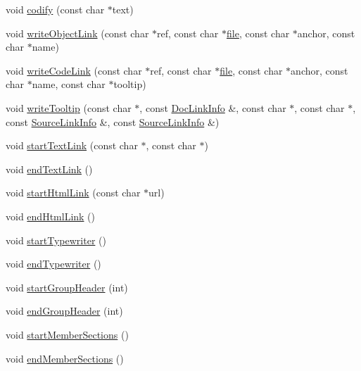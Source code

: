 \begin{DoxyCompactItemize}
void \hyperlink{class_man_generator_a6e70bf6444a4e6d5db43f5bbb7b6b125}{codify} (const char $\ast$text)
\item 
void \hyperlink{class_man_generator_a4bcf9c17c915914aca7b271c85aa08ea}{write\+Object\+Link} (const char $\ast$ref, const char $\ast$\hyperlink{class_output_generator_aed5ad11c3844cdf71ec6fee6c1c84286}{file}, const char $\ast$anchor, const char $\ast$name)
\item 
void \hyperlink{class_man_generator_ac4d91e5763d584238139d65d873e9f64}{write\+Code\+Link} (const char $\ast$ref, const char $\ast$\hyperlink{class_output_generator_aed5ad11c3844cdf71ec6fee6c1c84286}{file}, const char $\ast$anchor, const char $\ast$name, const char $\ast$tooltip)
\item 
void \hyperlink{class_man_generator_a8ec440b278091bf61579f35cd8237a25}{write\+Tooltip} (const char $\ast$, const \hyperlink{struct_doc_link_info}{Doc\+Link\+Info} \&, const char $\ast$, const char $\ast$, const \hyperlink{struct_source_link_info}{Source\+Link\+Info} \&, const \hyperlink{struct_source_link_info}{Source\+Link\+Info} \&)
\item 
void \hyperlink{class_man_generator_a3c1d7362119d49471f88a39189e63869}{start\+Text\+Link} (const char $\ast$, const char $\ast$)
\item 
void \hyperlink{class_man_generator_ae0b59e20362769f00731c90f0e3fdc00}{end\+Text\+Link} ()
\item 
void \hyperlink{class_man_generator_a605e678d3be65519e6b94dff6e403e79}{start\+Html\+Link} (const char $\ast$url)
\item 
void \hyperlink{class_man_generator_a7323695cedb872064ddb450875b2baea}{end\+Html\+Link} ()
\item 
void \hyperlink{class_man_generator_aa03f575a82549d2393bb080337769f1c}{start\+Typewriter} ()
\item 
void \hyperlink{class_man_generator_a918922201985cac387c671a9767021d1}{end\+Typewriter} ()
\item 
void \hyperlink{class_man_generator_a69dbc09e1398a0f64796d28a45642bba}{start\+Group\+Header} (int)
\item 
void \hyperlink{class_man_generator_a826a7e069686709295c162b2b2db7e25}{end\+Group\+Header} (int)
\item 
void \hyperlink{class_man_generator_a712f6f2ffa6fcc93d783510760a7a337}{start\+Member\+Sections} ()
\item 
void \hyperlink{class_man_generator_a860d52eda1510b0c06177ac90c18b850}{end\+Member\+Sections} ()
\item 

\end{DoxyCompactItemize}
